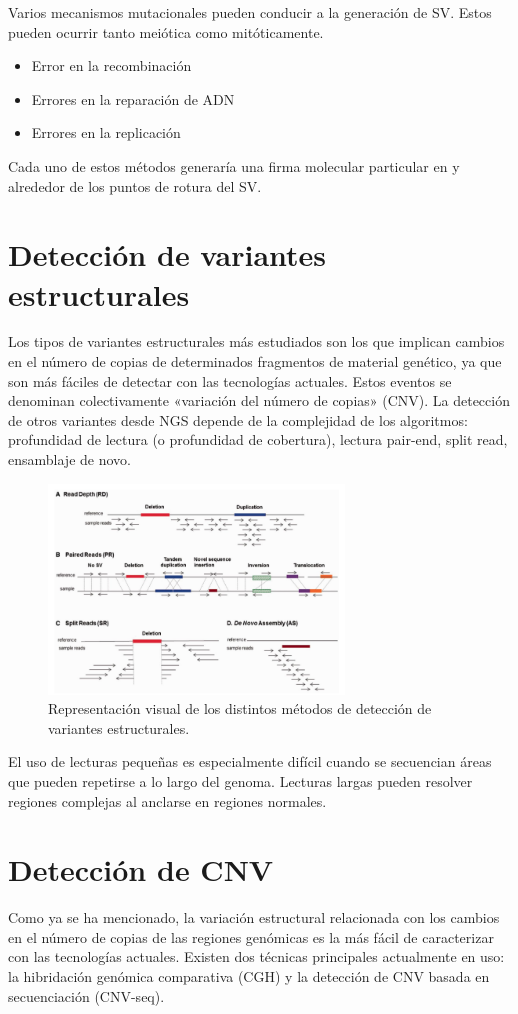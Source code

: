 \begin{itemize}
Varios mecanismos mutacionales pueden conducir a la generación de SV. Estos pueden ocurrir tanto meiótica como mitóticamente.
\begin{itemize}
\item Error en la recombinación
\item Errores en la reparación de ADN 
\item Errores en la replicación
\end{itemize}
Cada uno de estos métodos generaría una firma molecular particular en y alrededor de los puntos de rotura del SV.

\section{Detección de variantes estructurales}
Los tipos de variantes estructurales más estudiados son los que implican cambios en el número de copias de determinados fragmentos de material genético, ya que son más fáciles de detectar con las tecnologías actuales. Estos eventos se denominan colectivamente «variación del número de copias» (CNV). La detección de otros variantes desde NGS depende de la complejidad de los algoritmos: profundidad de lectura (o profundidad de cobertura), lectura pair-end, split read, ensamblaje de novo. 

\begin{figure}[h!]
\centering
\includegraphics[width = 0.7\textwidth]{figs/sv-detection-methods.png}
\caption{Representación visual de los distintos métodos de detección de variantes estructurales.}
\end{figure}

El uso de lecturas pequeñas es especialmente difícil cuando se secuencian áreas que pueden repetirse a lo largo del genoma. Lecturas largas pueden resolver regiones complejas al anclarse en regiones normales. 

\section{Detección de CNV}
Como ya se ha mencionado, la variación estructural relacionada con los cambios en el número de copias de las regiones genómicas es la más fácil de caracterizar con las tecnologías actuales.
Existen dos técnicas principales actualmente en uso: la hibridación genómica comparativa (CGH) y la detección de CNV basada en secuenciación (CNV-seq).


\end{itemize}
